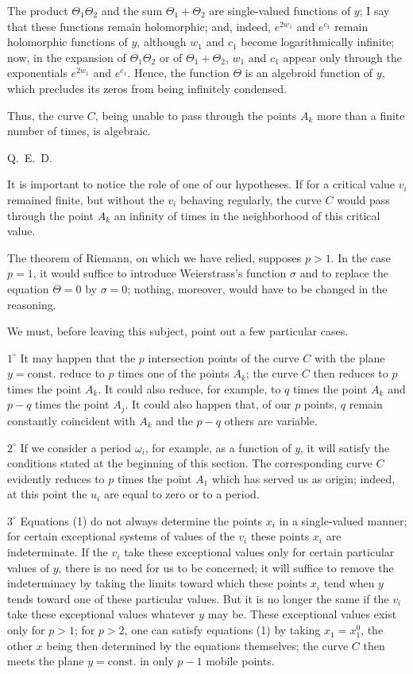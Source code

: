 \documentclass{article}
\begin{document}
The product $\Theta_{1} \Theta_{2}$ and the sum $\Theta_{1} + \Theta_{2}$ are single-valued functions of $y$; I say that these functions remain holomorphic; and, indeed, $e^{2 w_{1}}$ and $e^{c_{1}}$ remain holomorphic functions of $y$, although $w_{1}$ and $c_{1}$ become logarithmically infinite; now, in the expansion of $\Theta_{1} \Theta_{2}$ or of $\Theta_{1} + \Theta_{2}$, $w_{1}$ and $c_{1}$ appear only through the exponentials $e^{2 w_{1}}$ and $e^{c_{1}}$. Hence, the function $\Theta$ is an algebroid function of $y$, which precludes its zeros from being infinitely condensed.

Thus, the curve $C$, being unable to pass through the points $A_{k}$ more than a finite number of times, is algebraic.

\hfill Q.~E.~D.

It is important to notice the role of one of our hypotheses. If for a critical value $v_{i}$ remained finite, but without the $v_{i}$ behaving regularly, the curve $C$ would pass through the point $A_{k}$ an infinity of times in the neighborhood of this critical value.

The theorem of Riemann, on which we have relied, supposes $p > 1$. In the case $p = 1$, it would suffice to introduce Weierstrass's function $\sigma$ and to replace the equation $\Theta = 0$ by $\sigma = 0$; nothing, moreover, would have to be changed in the reasoning.

We must, before leaving this subject, point out a few particular cases.

$1^\circ$ It may happen that the $p$ intersection points of the curve $C$ with the plane $y = \text{const.}$ reduce to $p$ times one of the points $A_{k}$; the curve $C$ then reduces to $p$ times the point $A_{k}$. It could also reduce, for example, to $q$ times the point $A_{k}$ and $p - q$ times the point $A_{j}$. It could also happen that, of our $p$ points, $q$ remain constantly coincident with $A_{k}$ and the $p - q$ others are variable.

$2^\circ$ If we consider a period $\omega_{i}$, for example, as a function of $y$, it will satisfy the conditions stated at the beginning of this section. The corresponding curve $C$ evidently reduces to $p$ times the point $A_{1}$ which has served us as origin; indeed, at this point the $u_{i}$ are equal to zero or to a period.

$3^\circ$ Equations (1) do not always determine the points $x_{i}$ in a single-valued manner; for certain exceptional systems of values of the $v_{i}$ these points $x_{i}$ are indeterminate. If the $v_{i}$ take these exceptional values only for certain particular values of $y$, there is no need for us to be concerned; it will suffice to remove the indeterminacy by taking the limits toward which these points $x_{i}$ tend when $y$ tends toward one of these particular values. But it is no longer the same if the $v_{i}$ take these exceptional values whatever $y$ may be. These exceptional values exist only for $p > 1$; for $p > 2$, one can satisfy equations (1) by taking $x_{1} = x_{1}^{0}$, the other $x$ being then determined by the equations themselves; the curve $C$ then meets the plane $y = \text{const.}$ in only $p - 1$ mobile points.
\end{document}
